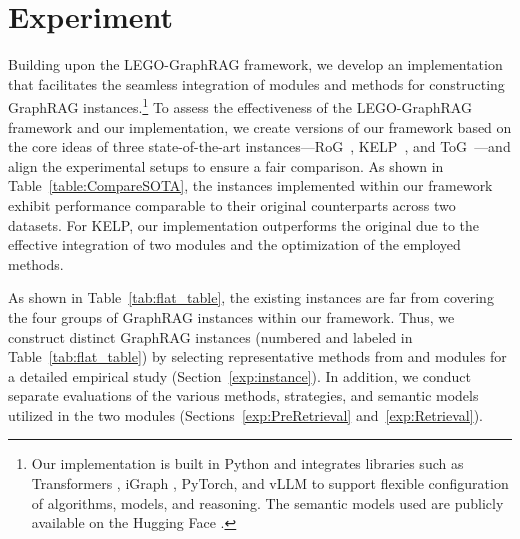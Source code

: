 
\section{Experiment}
\label{section: experiment}

%
Building upon the LEGO-GraphRAG framework, we develop an implementation that facilitates the seamless integration of modules and methods for constructing GraphRAG instances.\footnote{Our implementation is built in Python and integrates libraries such as Transformers {\cite{transformers}}, iGraph {\cite{iGraph}}, PyTorch{\cite{PyTorch}}, and vLLM {\cite{vLLM}} to support flexible configuration of algorithms, models, and reasoning. The semantic models used are publicly available on the Hugging Face {\cite{huggingfaceHuggingFace}}.}
To assess the effectiveness of the LEGO-GraphRAG framework and our implementation, we create versions of our framework based on the core ideas of three state-of-the-art instances—RoG~\cite{RoG}, KELP~\cite{ref:kelp}, and ToG~\cite{ToG}—and align the experimental setups to ensure a fair comparison. As shown in Table~\ref{table:CompareSOTA}, the instances implemented within our framework exhibit performance comparable to their original counterparts across two datasets. %
For KELP, our implementation outperforms the original due to the effective integration of two modules and the optimization of the employed methods.


As shown in Table~\ref{tab:flat_table}, the existing instances are far from covering the four groups of GraphRAG instances within our framework. Thus, we construct {\InstanceNum} distinct GraphRAG instances (numbered and labeled in Table~\ref{tab:flat_table}) by selecting representative methods from {\preRetrieval} and {\retrieval} modules for a detailed empirical study (Section~\ref{exp:instance}). In addition, we conduct separate evaluations of the various methods, strategies, and semantic models utilized in the two modules (Sections~\ref{exp:PreRetrieval} and~\ref{exp:Retrieval}). 






